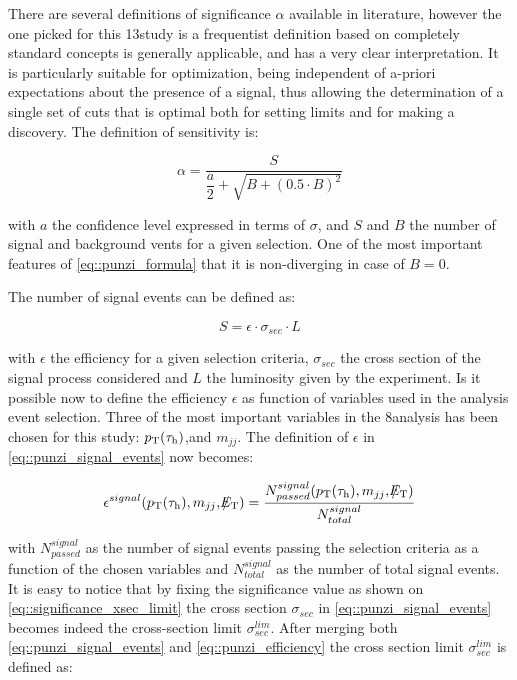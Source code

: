 There are several definitions of significance $\alpha$ available in literature, however the one picked for this 13\tev study is a frequentist definition based on completely standard concepts\cite{Punzi:2003bu} is generally applicable, and has a very clear interpretation. It is particularly suitable for optimization, being independent of a-priori expectations about the presence of a signal, thus allowing the determination of a single set of cuts that is optimal both for setting limits and for making a discovery. The definition of sensitivity is:

\begin{equation}
\alpha = \dfrac{S}{\dfrac{a}{2} + \sqrt{B + (0.5 \cdot B)^{2}}}
\label{eq::punzi_formula}
\end{equation}

with $a$ the confidence level expressed in terms of $\sigma$, and $S$ and $B$ the number of signal and background vents for a given selection. One of the most important features of \autoref{eq::punzi_formula} that it is non-diverging in case of $B = 0$.

The number of signal events can be defined as:

\begin{equation}
S = \epsilon \cdot \sigma_{sec} \cdot L
\label{eq::punzi_signal_events}
\end{equation}

with $\epsilon$ the efficiency for a given selection criteria, $\sigma_{sec}$ the cross section of the signal process considered and $L$ the luminosity given by the experiment. Is it possible now to define the efficiency $\epsilon$ as function of variables used in the analysis event selection. Three of the most important variables in the 8\tev analysis has been chosen for this study: $p_{\text{T}}(\tau_{\text{h}})$,\met and $m_{jj}$. The definition of $\epsilon$ in \autoref{eq::punzi_signal_events} now becomes:

\begin{equation}
\epsilon^{signal} ( p_{\text{T}}(\tau_{\text{h}}) , m_{jj} ,  \slash\mkern-12mu{E}_{\text{T}} ) = \dfrac{N^{signal}_{passed}(p_{\text{T}}(\tau_{\text{h}}) , m_{jj} ,  \slash\mkern-12mu{E}_{\text{T}})}{N^{signal}_{total}}
\label{eq::punzi_efficiency}
\end{equation}

with $N^{signal}_{passed}$ as the number of signal events passing the selection criteria as a function of the chosen variables and $N^{signal}_{total}$ as the number of total signal events. It is easy to notice that by fixing the significance value as shown on \autoref{eq::significance_xsec_limit} the cross section $\sigma_{sec}$ in \autoref{eq::punzi_signal_events} becomes indeed the cross-section limit $\sigma^{lim}_{sec}$. After merging both \autoref{eq::punzi_signal_events} and \autoref{eq::punzi_efficiency} the cross section limit $\sigma^{lim}_{sec}$ is defined as:
	
